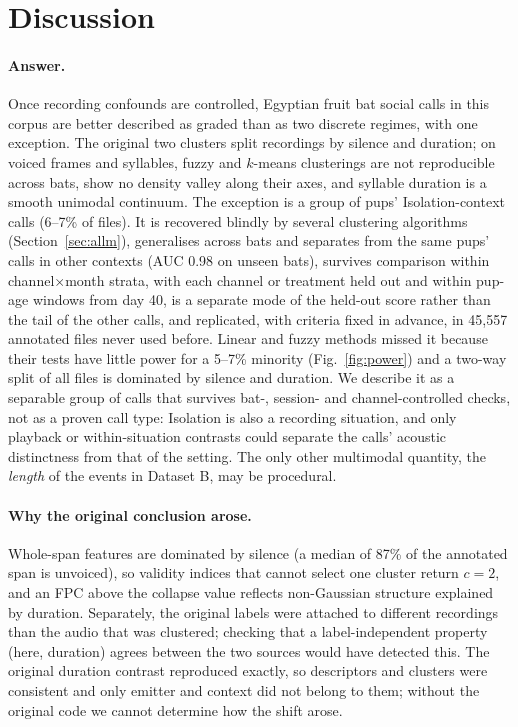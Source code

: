 \section{Discussion}
\paragraph{Answer.} Once recording confounds are controlled, Egyptian fruit bat social calls in this corpus are better described as graded than as two discrete regimes, with one exception. The original two clusters split recordings by silence and duration; on voiced frames and syllables, fuzzy and $k$-means clusterings are not reproducible across bats, show no density valley along their axes, and syllable duration is a smooth unimodal continuum. The exception is a group of pups' Isolation-context calls (6--7\% of files). It is recovered blindly by several clustering algorithms (Section~\ref{sec:allm}), generalises across bats and separates from the same pups' calls in other contexts (AUC 0.98 on unseen bats), survives comparison within channel$\times$month strata, with each channel or treatment held out and within pup-age windows from day 40, is a separate mode of the held-out score rather than the tail of the other calls, and replicated, with criteria fixed in advance, in 45,557 annotated files never used before. Linear and fuzzy methods missed it because their tests have little power for a 5--7\% minority (Fig.~\ref{fig:power}) and a two-way split of all files is dominated by silence and duration. We describe it as a separable group of calls that survives bat-, session- and channel-controlled checks, not as a proven call type: Isolation is also a recording situation, and only playback or within-situation contrasts could separate the calls' acoustic distinctness from that of the setting. The only other multimodal quantity, the \emph{length} of the events in Dataset B, may be procedural.

\paragraph{Why the original conclusion arose.} Whole-span features are dominated by silence (a median of 87\% of the annotated span is unvoiced), so validity indices that cannot select one cluster return $c=2$, and an FPC above the collapse value reflects non-Gaussian structure explained by duration. Separately, the original labels were attached to different recordings than the audio that was clustered; checking that a label-independent property (here, duration) agrees between the two sources would have detected this. The original duration contrast reproduced exactly, so descriptors and clusters were consistent and only emitter and context did not belong to them; without the original code we cannot determine how the shift arose.

